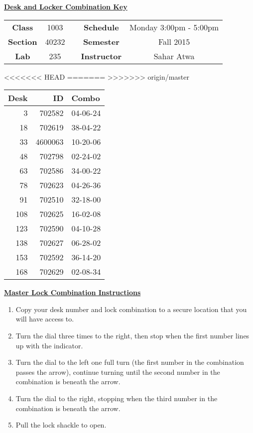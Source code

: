\documentclass[12pt]{article}
\begin{document}
\thispagestyle{empty}

\begin{center}
	{\huge\textbf{\underline{ Desk and Locker Combination Key}}}
\end{center}


\begin{table}[h]
  \centering
  \begin{tabular}{ccccc}

  \textbf{Class} & 1003 & {\qquad} &\textbf{Schedule} & Monday 3:00pm - 5:00pm \\
  \textbf{Section} & 40232 & {\qquad} & \textbf{Semester} & Fall 2015 \\
  \textbf{Lab} & 235 & {\qquad} & \textbf{Instructor} & Sahar Atwa \\
  \end{tabular}
\end{table}
<<<<<<< HEAD
 \vspace{0.1in}
=======
 \vspace{0.5in}
>>>>>>> origin/master
\begin{minipage}{0.4\textwidth}

\begin{tabular}{rrl}
\toprule
 Desk &       ID &     Combo \\
\midrule
    3 &   702582 &  04-06-24 \\
   18 &   702619 &  38-04-22 \\
   33 &  4600063 &  10-20-06 \\
   48 &   702798 &  02-24-02 \\
   63 &   702586 &  34-00-22 \\
   78 &   702623 &  04-26-36 \\
   91 &   702510 &  32-18-00 \\
  108 &   702625 &  16-02-08 \\
  123 &   702590 &  04-10-28 \\
  138 &   702627 &  06-28-02 \\
  153 &   702592 &  36-14-20 \\
  168 &   702629 &  02-08-34 \\
\bottomrule
\end{tabular}


\end{minipage}
\begin{minipage}{0.4\textwidth}
\underline{{\large \textbf{Master Lock Combination Instructions}}}
\begin{enumerate}
\item Copy your desk number and lock combination to a secure location that you will have access to.
\item Turn the dial three times to the right, then stop when the first number lines up with the indicator.
\item Turn the dial to the left one full turn (the first number in the combination passes the arrow), continue turning until the second number in the combination is beneath the arrow.
\item Turn the dial to the right, stopping when the third number in the combination is beneath the arrow.
\item Pull the lock shackle to open.
\end{enumerate}
\end{minipage}
\end{document}
